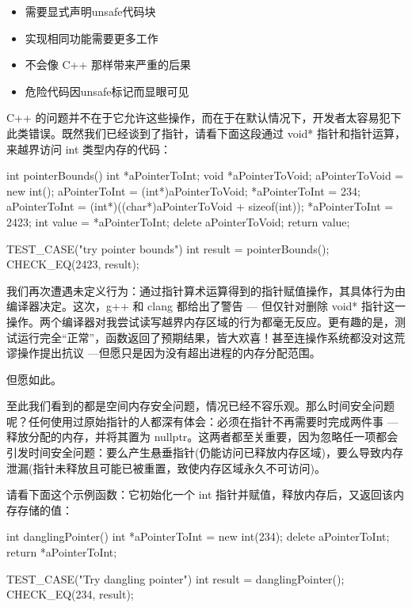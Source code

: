 \begin{itemize}
\item 
需要显式声明unsafe代码块

\item 
实现相同功能需要更多工作

\item 
不会像 C++ 那样带来严重的后果

\item 
危险代码因unsafe标记而显眼可见
\end{itemize}

C++ 的问题并不在于它允许这些操作，而在于在默认情况下，开发者太容易犯下此类错误。既然我们已经谈到了指针，请看下面这段通过 void* 指针和指针运算，来越界访问 int 类型内存的代码：

\begin{cpp}
int pointerBounds() {
  int *aPointerToInt;
  void *aPointerToVoid;
  aPointerToVoid = new int();
  aPointerToInt = (int*)aPointerToVoid;
  *aPointerToInt = 234;
  aPointerToInt = (int*)((char*)aPointerToVoid + sizeof(int));
  *aPointerToInt = 2423;
  int value = *aPointerToInt;
  delete aPointerToVoid;
  return value;
}

TEST_CASE("try pointer bounds"){
  int result = pointerBounds();
  CHECK_EQ(2423, result);
}
\end{cpp}

我们再次遭遇未定义行为：通过指针算术运算得到的指针赋值操作，其具体行为由编译器决定。这次，g++ 和 clang 都给出了警告 --- 但仅针对删除 void* 指针这一操作。两个编译器对我尝试读写越界内存区域的行为都毫无反应。更有趣的是，测试运行完全“正常”，函数返回了预期结果，皆大欢喜！甚至连操作系统都没对这荒谬操作提出抗议 ---但愿只是因为没有超出进程的内存分配范围。

但愿如此。

至此我们看到的都是空间内存安全问题，情况已经不容乐观。那么时间安全问题呢？任何使用过原始指针的人都深有体会：必须在指针不再需要时完成两件事 --- 释放分配的内存，并将其置为 nullptr。这两者都至关重要，因为忽略任一项都会引发时间安全问题：要么产生悬垂指针(仍能访问已释放内存区域)，要么导致内存泄漏(指针未释放且可能已被重置，致使内存区域永久不可访问)。

请看下面这个示例函数：它初始化一个 int 指针并赋值，释放内存后，又返回该内存存储的值：

\begin{cpp}
int danglingPointer() {
  int *aPointerToInt = new int(234);
  delete aPointerToInt;
  return *aPointerToInt;
}

TEST_CASE("Try dangling pointer"){
  int result = danglingPointer();
  CHECK_EQ(234, result);
}
\end{cpp}

